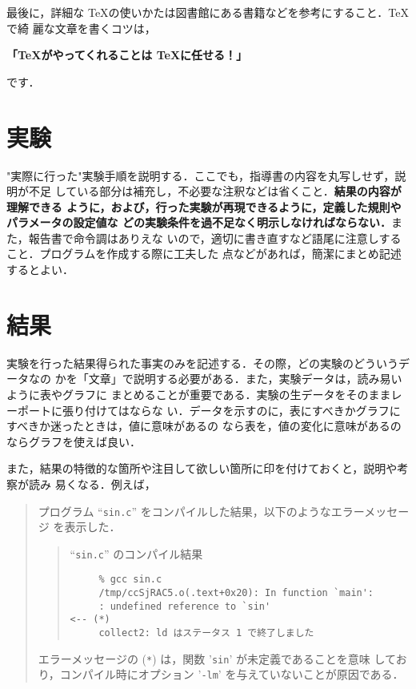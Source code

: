 \documentclass[a4j]{jsarticle}  %
\begin{document}
最後に，詳細な \TeX の使いかたは図書館にある書籍などを参考にすること．\TeX で綺
麗な文章を書くコツは，
\begin{center}
 {\large \bf 「\TeX がやってくれることは \TeX に任せる！」}
\end{center}
です．

\section{実験}
"実際に行った"実験手順を説明する．ここでも，指導書の内容を丸写しせず，説明が不足
している部分は補充し，不必要な注釈などは省くこと．\textbf{結果の内容が理解できる
ように，および，行った実験が再現できるように，定義した規則やパラメータの設定値な
どの実験条件を過不足なく明示しなければならない．}また，報告書で命令調はありえな
いので，適切に書き直すなど語尾に注意しすること．プログラムを作成する際に工夫した
点などがあれば，簡潔にまとめ記述するとよい．

\section{結果}
実験を行った結果得られた事実のみを記述する．その際，どの実験のどういうデータなの
かを「文章」で説明する必要がある．また，実験データは，読み易いように表やグラフに
まとめることが重要である．実験の生データをそのままレーポートに張り付けてはならな
い．データを示すのに，表にすべきかグラフにすべきか迷ったときは，値に意味があるの
なら表を，値の変化に意味があるのならグラフを使えば良い．

また，結果の特徴的な箇所や注目して欲しい箇所に印を付けておくと，説明や考察が読み
易くなる．例えば，

\bigskip 

\begin{quote}
プログラム ``\texttt{sin.c}'' をコンパイルした結果，以下のようなエラーメッセージ
を表示した．

\begin{quote}
 \begin{itembox}[l]{``\texttt{sin.c}'' のコンパイル結果}
\begin{verbatim}
	 % gcc sin.c
	 /tmp/ccSjRAC5.o(.text+0x20): In function `main':
	 : undefined reference to `sin'                          <-- (*)
	 collect2: ld はステータス 1 で終了しました
\end{verbatim}
 \end{itembox}
\end{quote}

エラーメッセージの (\texttt{*}) は，関数 '\texttt{sin}' が未定義であることを意味
しており，コンパイル時にオプション '\texttt{-lm}' を与えていないことが原因である．
\end{quote}
\end{document}
